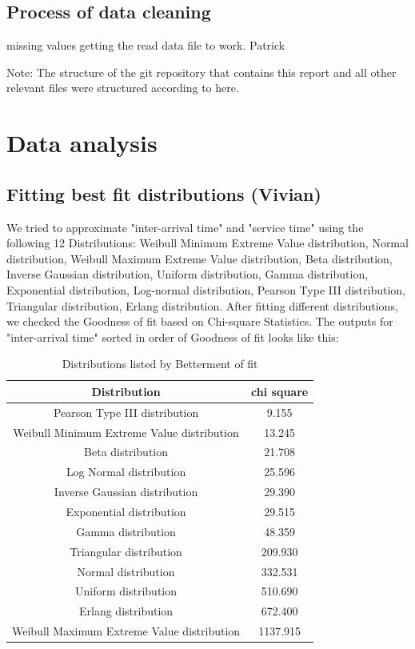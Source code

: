 \documentclass{article}
\begin{document}
\subsection{Process of data cleaning}
missing values 
getting the read data file to work. Patrick

Note: The structure of the git repository that contains this report and all other relevant files were structured according to here\cite{frery2020badging}.

\section{Data analysis}

\subsection{Fitting best fit distributions (Vivian)}

We tried to approximate "inter-arrival time" and "service time" using the following 12 Distributions: Weibull Minimum Extreme Value distribution, Normal distribution, Weibull Maximum Extreme Value distribution, Beta distribution, Inverse Gaussian distribution, Uniform distribution, Gamma distribution, Exponential distribution, Log-normal distribution, Pearson Type III distribution, Triangular distribution, Erlang distribution. After fitting different distributions, we checked the Goodness of fit based on Chi-square Statistics. The outputs for "inter-arrival time" sorted in order of Goodness of fit looks like this: 


\begin{table}[H]
    \caption{Distributions listed by Betterment of fit}
    \label{tab:Inter-arrival Best Fit}
    \begin{center}
    \begin{tabular}{c S}
        \toprule
        \textbf{Distribution} & \textbf{chi square}\\
        \midrule
        Pearson Type III distribution & 9.155\\
        Weibull Minimum Extreme Value distribution & 13.245\\
        Beta distribution & 21.708\\
        Log Normal distribution & 25.596\\
        Inverse Gaussian distribution & 29.390\\
        Exponential distribution & 29.515\\
        Gamma distribution & 48.359\\
        Triangular distribution & 209.930\\
        Normal distribution & 332.531\\
        Uniform distribution & 510.690\\
        Erlang distribution & 672.400\\
        Weibull Maximum Extreme Value distribution & 1137.915\\
        \bottomrule
    \end{tabular}
    \end{center}
\end{table}
\end{document}
